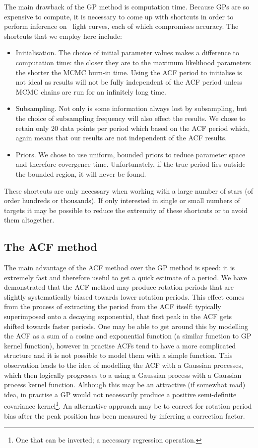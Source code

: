 The main drawback of the GP method is computation time.
Because GPs are so expensive to compute, it is necessary to come up with
shortcuts in order to perform inference on \kepler\ light curves, each of
which compromises accuracy.
The shortcuts that we employ here include:
\begin{itemize}
\item{Initialisation.
The choice of initial parameter values makes a difference to computation time:
the closer they are to the maximum likelihood parameters the shorter the MCMC
burn-in time.
Using the ACF period to initialise is not ideal as results will not be fully
independent of the ACF period unless MCMC chains are run for an infinitely
long time.} \item{Subsampling.
Not only is some information always lost by subsampling, but the choice of
subsampling frequency will also effect the results.
We chose to retain only 20 data points per period which based on the ACF
period which, again means that our results are not independent of the ACF
results.}
\item{Priors.
We chose to use uniform, bounded priors to reduce parameter space and
therefore covergence time.
Unfortunately, if the true period lies outside the bounded region, it will
never be found.}
\end{itemize}

These shortcuts are only necessary when working with a large number of stars
(of order hundreds or thousands).
If only interested in single or small numbers of targets it may be possible to
reduce the extremity of these shortcuts or to avoid them altogether.

\subsection{The ACF method}
The main advantage of the ACF method over the GP method is speed: it is
extremely fast and therefore useful to get a quick estimate of a period.
We have demonstrated that the ACF method may produce rotation periods that are
slightly systematically biased towards lower rotation periods.
This effect comes from the process of extracting the period from the ACF
itself: typically superimposed onto a decaying exponential, that first peak in
the ACF gets shifted towards faster periods.
One may be able to get around this by modelling the ACF as a sum of a cosine
and exponential function (a similar function to GP kernel function), however
in practise ACFs tend to have a more complicated structure and it is not
possible to model them with a simple function.
This observation leads to the idea of modelling the ACF with a Gaussian
processes, which then logically progresses to a using a Gaussian process with
a Gaussian process kernel function.
Although this may be an attractive (if somewhat mad) idea, in practise a GP
would not necessarily produce a positive semi-definite covariance
kernel\footnote{One that can be inverted; a necessary regression operation.}.
An alternative approach may be to correct for rotation period bias after the
peak position has been measured by inferring a correction factor.

